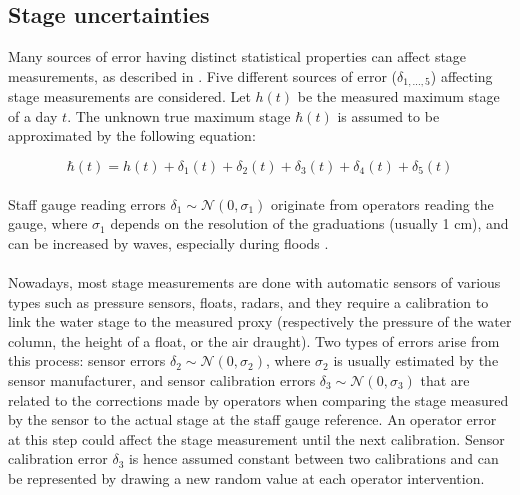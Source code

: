     \subsection{Stage uncertainties}
    \label{subsec:StageErr}
    
    Many sources of error having distinct statistical properties can affect stage measurements, as described in \citet{horner_impact_2018}. Five different sources of error ($\delta_{1,...,5}$) affecting stage measurements are considered. Let $h(t)$ be the measured maximum stage of a day $t$. The unknown true maximum stage $\hbar(t)$ is assumed to be approximated by the following equation:
    
    \begin{equation}
        \hbar(t) = h(t) + \delta_1(t) + \delta_2(t) + \delta_3(t) + \delta_4(t) + \delta_5(t)
        \label{eq:StageError}
    \end{equation}

    \paragraph{}Staff gauge reading errors $\delta_1 \sim \mathcal{N}(0,\sigma_1)$ originate from operators reading the gauge, where $\sigma_1$ depends on the resolution of the graduations (usually 1 cm), and can be increased by waves, especially during floods \citep{mcmillan_benchmarking_2012}.

    \paragraph{}Nowadays, most stage measurements are done with automatic sensors of various types such as pressure sensors, floats, radars, and they require a calibration to link the water stage to the measured proxy (respectively the pressure of the water column, the height of a float, or the air draught). Two types of errors arise from this process: sensor errors $\delta_2 \sim \mathcal{N}(0,\sigma_2)$, where $\sigma_2$ is usually estimated by the sensor manufacturer, and sensor calibration errors $\delta_3 \sim \mathcal{N}(0,\sigma_3)$ that are related to the corrections made by operators when comparing the stage measured by the sensor to the actual stage at the staff gauge reference. An operator error at this step could affect the stage measurement until the next calibration. Sensor calibration error $\delta_3$ is hence assumed constant between two calibrations and can be represented by drawing a new random value at each operator intervention.
    
